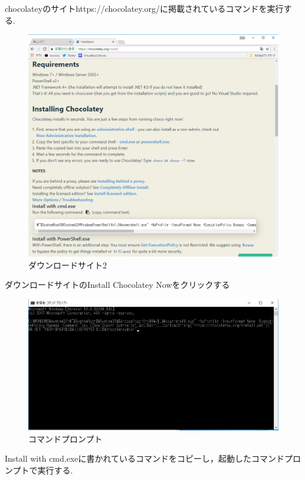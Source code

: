 chocolateyのサイトhttps://chocolatey.org/に掲載されているコマンドを実行する.

\begin{figure}[h]
\centering
\includegraphics[width=13cm]{choco3.png}
\caption{ダウンロードサイト2}\label{サンプル図}
\end{figure}

ダウンロードサイトのInstall Chocolatey Nowをクリックする



\newpage

\begin{figure}[h]
\centering
\includegraphics[width=13cm]{choco4.png}
\caption{コマンドプロンプト}\label{サンプル図}
\end{figure}

Install with cmd.exeに書かれているコマンドをコピーし，起動したコマンドプロンプトで実行する.

